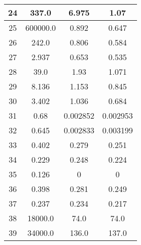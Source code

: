 \begin{table}[H]
\begin{minipage}{5cm}
{\begin{tabular}{|c|c|c|c|}
            \hline
            24 & 337.0 & 6.975 & 1.07 \\
            \hline
            25 & 600000.0 & 0.892 & 0.647 \\
            \hline
            26 & 242.0 & 0.806 & 0.584 \\
            \hline
            27 & 2.937 & 0.653 & 0.535 \\
            \hline
            28 & 39.0 & 1.93 & 1.071 \\
            \hline
            29 & 8.136 & 1.153 & 0.845 \\
            \hline
            30 & 3.402 & 1.036 & 0.684 \\
            \hline
            31 & 0.68 & 0.002852 & 0.002953 \\
            \hline
            32 & 0.645 & 0.002833 & 0.003199 \\
            \hline
            33 & 0.402 & 0.279 & 0.251 \\
            \hline
            34 & 0.229 & 0.248 & 0.224 \\
            \hline
            35 & 0.126 & 0 & 0 \\
            \hline
            36 & 0.398 & 0.281 & 0.249 \\
            \hline
            37 & 0.237 & 0.234 & 0.217 \\
            \hline
            38 & 18000.0 & 74.0 & 74.0 \\
            \hline
            39 & 34000.0 & 136.0 & 137.0 \\
            \hline
            \end{tabular}
        }
    \end{minipage}
    \begin{minipage}{5.02cm}
\end{minipage}
\end{table}
